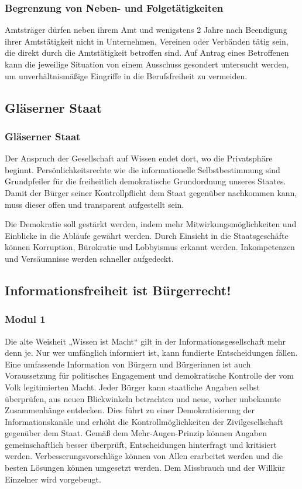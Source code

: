 \subsubsection{Begrenzung von Neben- und Folgetätigkeiten}
\abstimmung
Amtsträger dürfen neben ihrem Amt und wenigstens 2 Jahre nach Beendigung ihrer Amtstätigkeit nicht in Unternehmen, Vereinen oder Verbänden tätig sein, die direkt durch die Amtstätigkeit betroffen sind. Auf Antrag eines Betroffenen kann die jeweilige Situation von einem Ausschuss gesondert untersucht werden, um unverhältnismäßige Eingriffe in die Berufsfreiheit zu vermeiden.
 
\subsection*{Gläserner Staat}
\subsubsection{Gläserner Staat}
\abstimmung
Der Anspruch der Gesellschaft auf Wissen endet dort, wo die Privatsphäre beginnt. Persönlichkeitsrechte wie die informationelle Selbstbestimmung sind Grundpfeiler für die freiheitlich demokratische Grundordnung unseres Staates. Damit der Bürger seiner Kontrollpflicht dem Staat gegenüber nachkommen kann, muss dieser offen und transparent aufgestellt sein.

Die Demokratie soll gestärkt werden, indem mehr Mitwirkungsmöglichkeiten und Einblicke in die Abläufe gewährt werden. Durch Einsicht in die Staatsgeschäfte können Korruption, Bürokratie und Lobbyismus erkannt werden. Inkompetenzen und Versäumnisse werden schneller aufgedeckt.
 
\subsection*{Informationsfreiheit ist Bürgerrecht!}
\label{transparenz:infofreiheit}
\subsubsection{Modul 1}
\abstimmung
Die alte Weisheit „Wissen ist Macht“ gilt in der Informationsgesellschaft mehr denn je. Nur wer umfänglich informiert ist, kann fundierte Entscheidungen fällen. Eine umfassende Information von Bürgern und Bürgerinnen ist auch Voraussetzung für politisches Engagement und demokratische Kontrolle der vom Volk legitimierten Macht. Jeder Bürger kann staatliche Angaben selbst überprüfen, aus neuen Blickwinkeln betrachten und neue, vorher unbekannte Zusammenhänge entdecken. Dies führt zu einer Demokratisierung der Informationskanäle und erhöht die Kontrollmöglichkeiten der Zivilgesellschaft gegenüber dem Staat. Gemäß dem Mehr-Augen-Prinzip können Angaben gemeinschaftlich besser überprüft, Entscheidungen hinterfragt und kritisiert werden. Verbesserungsvorschläge können von Allen erarbeitet werden und die besten Lösungen können umgesetzt werden. Dem Missbrauch und der Willkür Einzelner wird vorgebeugt.

